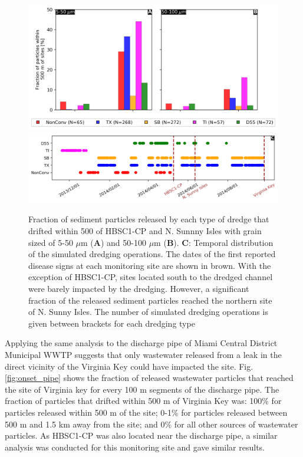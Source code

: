 \documentclass[preprint,12pt,authoryear]{elsarticle}
\begin{document}
\begin{figure}
    \centering
    \includegraphics[width=\textwidth]{figures/aggregated_new.png}
    \includegraphics[width=\textwidth]{figures/timeline.png}
    \caption{Fraction of sediment particles released by each type of dredge that drifted within 500 of HBSC1-CP and N. Sunnny Isles with grain sized of 5-50 $\mu$m (\textbf{A}) and 50-100 $\mu$m (\textbf{B}). \textbf{C}: Temporal distribution of the simulated dredging operations. The dates of the first reported disease signs at each monitoring site are shown in brown. With the exception of HBSC1-CP, sites located south to the dredged channel were barely impacted by the dredging. However, a significant fraction of the released sediment particles reached the northern site of N. Sunny Isles. The number of simulated dredging operations is given between brackets for each dredging type}
    \label{fig:onset_bar}
\end{figure}

Applying the same analysis to the discharge pipe of Miami Central District Municipal WWTP suggests that only wastewater released from a leak in the direct vicinity of the Virginia Key could have impacted the site. Fig. \ref{fig:onset_pipe} shows the fraction of released wastewater particles that reached the site of Virginia key for every 100 m segments of the discharge pipe. The fraction of particles that drifted within 500 m of Virginia Key was: 100\% for particles released within 500 m of the site; 0-1\% for particles released between 500 m and 1.5 km away from the site; and 0\% for all other sources of wastewater particles. As HBSC1-CP was also located near the discharge pipe, a similar analysis was conducted for this monitoring site and gave similar results.
\end{document}
